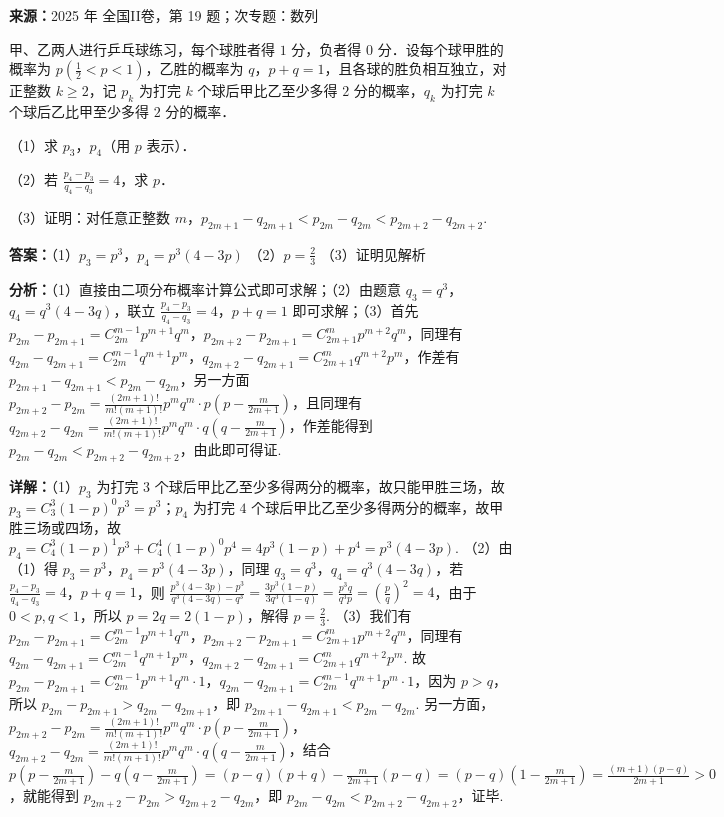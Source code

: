 \begin{question}[points=17]
\textbf{来源：}2025 年 全国II卷，第 19 题；次专题：数列\par
甲、乙两人进行乒乓球练习，每个球胜者得 $1$ 分，负者得 $0$ 分．设每个球甲胜的概率为 $p\left(\frac{1}{2}<p<1\right)$，乙胜的概率为 $q$，$p+q=1$，且各球的胜负相互独立，对正整数 $k\ge 2$，记 $p_k$ 为打完 $k$ 个球后甲比乙至少多得 $2$ 分的概率，$q_k$ 为打完 $k$ 个球后乙比甲至少多得 $2$ 分的概率．

（1）求 $p_3$，$p_4$（用 $p$ 表示）．

（2）若 $\frac{p_4-p_3}{q_4-q_3}=4$，求 $p$．

（3）证明：对任意正整数 $m$，$p_{2m+1}-q_{2m+1}<p_{2m}-q_{2m}<p_{2m+2}-q_{2m+2}$.
\begin{solution}
\textbf{答案：}（1）$p_3=p^3$，$p_4=p^3(4-3p)$
（2）$p=\frac{2}{3}$
（3）证明见解析

\textbf{分析：}（1）直接由二项分布概率计算公式即可求解；（2）由题意 $q_3=q^3$，$q_4=q^3(4-3q)$，联立 $\frac{p_4-p_3}{q_4-q_3}=4$，$p+q=1$ 即可求解；（3）首先 $p_{2m}-p_{2m+1}=C_{2m}^{m-1}p^{m+1}q^m$，$p_{2m+2}-p_{2m+1}=C_{2m+1}^{m}p^{m+2}q^m$，同理有 $q_{2m}-q_{2m+1}=C_{2m}^{m-1}q^{m+1}p^m$，$q_{2m+2}-q_{2m+1}=C_{2m+1}^{m}q^{m+2}p^m$，作差有 $p_{2m+1}-q_{2m+1}<p_{2m}-q_{2m}$，另一方面 $p_{2m+2}-p_{2m}=\frac{(2m+1)!}{m!(m+1)!}p^mq^m\cdot p\left(p-\frac{m}{2m+1}\right)$，且同理有 $q_{2m+2}-q_{2m}=\frac{(2m+1)!}{m!(m+1)!}p^mq^m\cdot q\left(q-\frac{m}{2m+1}\right)$，作差能得到 $p_{2m}-q_{2m}<p_{2m+2}-q_{2m+2}$，由此即可得证.

\textbf{详解：}（1）$p_3$ 为打完 $3$ 个球后甲比乙至少多得两分的概率，故只能甲胜三场，故 $p_3=C_3^3(1-p)^0p^3=p^3$；$p_4$ 为打完 $4$ 个球后甲比乙至少多得两分的概率，故甲胜三场或四场，故 $p_4=C_4^3(1-p)^1p^3+C_4^4(1-p)^0p^4=4p^3(1-p)+p^4=p^3(4-3p)$.
（2）由（1）得 $p_3=p^3$，$p_4=p^3(4-3p)$，同理 $q_3=q^3$，$q_4=q^3(4-3q)$，若 $\frac{p_4-p_3}{q_4-q_3}=4$，$p+q=1$，则 $\frac{p^3(4-3p)-p^3}{q^3(4-3q)-q^3}=\frac{3p^3(1-p)}{3q^3(1-q)}=\frac{p^3q}{q^3p}=\left(\frac{p}{q}\right)^2=4$，由于 $0<p,q<1$，所以 $p=2q=2(1-p)$，解得 $p=\frac{2}{3}$.
（3）我们有 $p_{2m}-p_{2m+1}=C_{2m}^{m-1}p^{m+1}q^m$，$p_{2m+2}-p_{2m+1}=C_{2m+1}^{m}p^{m+2}q^m$，同理有 $q_{2m}-q_{2m+1}=C_{2m}^{m-1}q^{m+1}p^m$，$q_{2m+2}-q_{2m+1}=C_{2m+1}^{m}q^{m+2}p^m$. 故 $p_{2m}-p_{2m+1}=C_{2m}^{m-1}p^{m+1}q^m\cdot 1$，$q_{2m}-q_{2m+1}=C_{2m}^{m-1}q^{m+1}p^m\cdot 1$，因为 $p>q$，所以 $p_{2m}-p_{2m+1}>q_{2m}-q_{2m+1}$，即 $p_{2m+1}-q_{2m+1}<p_{2m}-q_{2m}$. 另一方面，$p_{2m+2}-p_{2m}=\frac{(2m+1)!}{m!(m+1)!}p^mq^m\cdot p\left(p-\frac{m}{2m+1}\right)$，$q_{2m+2}-q_{2m}=\frac{(2m+1)!}{m!(m+1)!}p^mq^m\cdot q\left(q-\frac{m}{2m+1}\right)$，结合 $p\left(p-\frac{m}{2m+1}\right)-q\left(q-\frac{m}{2m+1}\right)=(p-q)(p+q)-\frac{m}{2m+1}(p-q)=(p-q)\left(1-\frac{m}{2m+1}\right)=\frac{(m+1)(p-q)}{2m+1}>0$，就能得到 $p_{2m+2}-p_{2m}>q_{2m+2}-q_{2m}$，即 $p_{2m}-q_{2m}<p_{2m+2}-q_{2m+2}$，证毕.
\end{solution}
\end{question}

